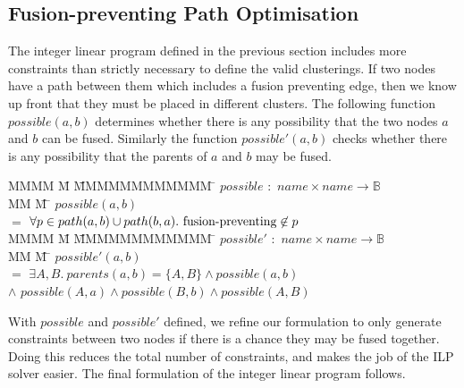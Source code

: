 \subsection{Fusion-preventing Path Optimisation}
\label{s:OptimisedConstraints}
The integer linear program defined in the previous section includes more constraints than strictly necessary to define the valid clusterings. If two nodes have a path between them which includes a fusion preventing edge, then we know up front that they must be placed in different clusters. The following function $possible(a,b)$ determines whether there is any possibility that the two nodes $a$ and $b$ can be fused. Similarly the function $possible'(a, b)$ checks whether there is any possibility that the parents of $a$ and $b$ may be fused.

\newpage

\begin{tabbing}
MMMM \= M \=     \= MMMMMMMMMMMM    \=  \kill
$possible$ \> $:$     \> $name \times name \to \mathbb{B}$      \\
MM        \= M    \= \kill
$possible(a,b)$ \\
    \>$=$  \>$\forall p \in path(a,b) \cup path(b,a).\ \fusionpreventing \not\in p$
\\[1ex]
MMMM \= M \=     \= MMMMMMMMMMMM    \=  \kill
$possible'$     \> $:$ \> $name \times name \to \mathbb{B}$      \\
MM        \= M    \= \kill
$possible'(a,b)$ \\
    \>$=$   \>$\exists A, B.\  parents(a,b) = \{A,B\} \wedge possible(a,b)$ \\
    \>$\wedge$ \> $possible(A,a) \wedge possible(B,b) \wedge possible(A,B)$
\end{tabbing}
With $possible$ and $possible'$ defined, we refine our formulation to only generate constraints between two nodes if there is a chance they may be fused together. Doing this reduces the total number of constraints, and makes the job of the ILP solver easier. The final formulation of the integer linear program follows.

